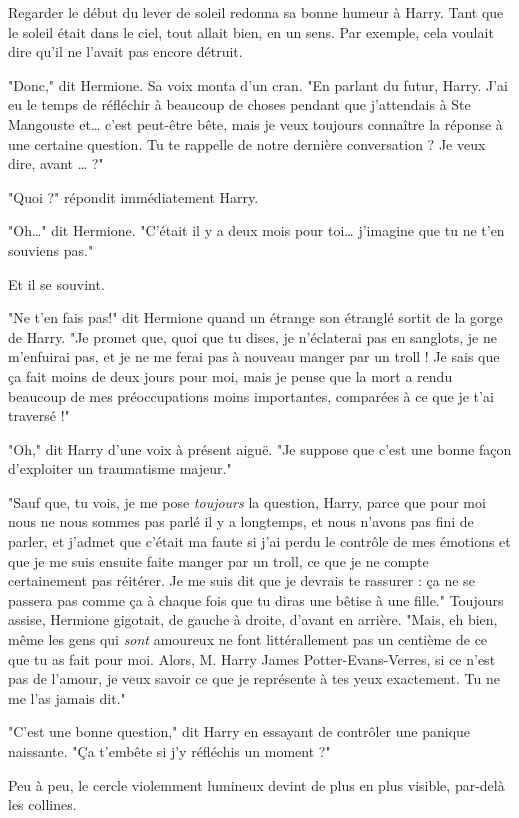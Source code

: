 Regarder le début du lever de soleil redonna sa bonne humeur à Harry. Tant que le soleil était dans le ciel, tout allait bien, en un sens. Par exemple, cela voulait dire qu'il ne l'avait pas encore détruit.

"Donc," dit Hermione. Sa voix monta d'un cran. "En parlant du futur, Harry. J'ai eu le temps de réfléchir à beaucoup de choses pendant que j'attendais à Ste Mangouste et… c'est peut-être bête, mais je veux toujours connaître la réponse à une certaine question. Tu te rappelle de notre dernière conversation ? Je veux dire, avant … ?"

"Quoi ?" répondit immédiatement Harry.

"Oh…" dit Hermione. "C'était il y a deux mois pour toi… j'imagine que tu ne t'en souviens pas."

Et il se souvint.

"Ne t'en fais pas!" dit Hermione quand un étrange son étranglé sortit de la gorge de Harry. "Je promet que, quoi que tu dises, je n'éclaterai pas en sanglots, je ne m'enfuirai pas, et je ne me ferai pas à nouveau manger par un troll ! Je sais que ça fait moins de deux jours pour moi, mais je pense que la mort a rendu beaucoup de mes préoccupations moins importantes, comparées à ce que je t'ai traversé !"

"Oh," dit Harry d'une voix à présent aiguë. "Je suppose que c'est une bonne façon d'exploiter un traumatisme majeur."

"Sauf que, tu vois, je me pose \emph{toujours}  la question, Harry, parce que pour moi nous ne nous sommes pas parlé il y a longtemps, et nous n'avons pas fini de parler, et j'admet que c'était ma faute si j'ai perdu le contrôle de mes émotions et que je me suis ensuite faite manger par un troll, ce que je ne compte certainement pas réitérer. Je me suis dit que je devrais te rassurer : ça ne se passera pas comme ça à chaque fois que tu diras une bêtise à une fille." Toujours assise, Hermione gigotait, de gauche à droite, d'avant en arrière. "Mais, eh bien, même les gens qui \emph{sont}  amoureux ne font littérallement pas un centième de ce que tu as fait pour moi. Alors, M. Harry James Potter-Evans-Verres, si ce n'est pas de l'amour, je veux savoir ce que je représente à tes yeux exactement. Tu ne me l'as jamais dit."

"C'est une bonne question," dit Harry en essayant de contrôler une panique naissante. "Ça t'embête si j'y réfléchis un moment ?"

Peu à peu, le cercle violemment lumineux devint de plus en plus visible, par-delà les collines.

